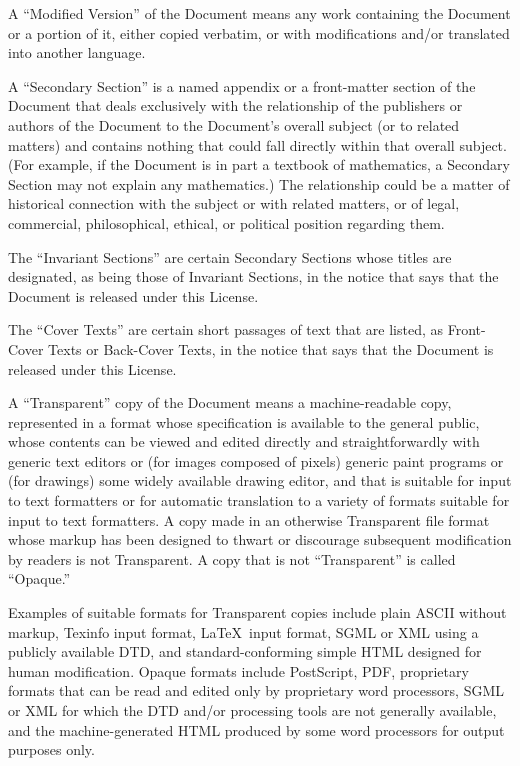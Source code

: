 A ``Modified Version'' of the Document means any work containing
the Document or a portion of it, either copied verbatim, or with modifications
and/or translated into another language.

A ``Secondary Section'' is a named appendix or a front-matter section
of the Document that deals exclusively with the relationship of the
publishers or authors of the Document to the Document's overall subject
(or to related matters) and contains nothing that could fall directly
within that overall subject. (For example, if the Document is in part
a textbook of mathematics, a Secondary Section may not explain any
mathematics.) The relationship could be a matter of historical connection
with the subject or with related matters, or of legal, commercial,
philosophical, ethical, or political position regarding them.

The ``Invariant Sections'' are certain Secondary Sections whose
titles are designated, as being those of Invariant Sections, in the
notice that says that the Document is released under this License.

The ``Cover Texts'' are certain short passages of text that are
listed, as Front-Cover Texts or Back-Cover Texts, in the notice that
says that the Document is released under this License.

A ``Transparent'' copy of the Document means a machine-readable
copy, represented in a format whose specification is available to
the general public, whose contents can be viewed and edited directly
and straightforwardly with generic text editors or (for images composed
of pixels) generic paint programs or (for drawings) some widely available
drawing editor, and that is suitable for input to text formatters
or for automatic translation to a variety of formats suitable for
input to text formatters. A copy made in an otherwise Transparent
file format whose markup has been designed to thwart or discourage
subsequent modification by readers is not Transparent. A copy that
is not ``Transparent'' is called ``Opaque.''

Examples of suitable formats for Transparent copies include plain
ASCII without markup, Texinfo input format, \LaTeX{}~input format,
SGML or XML using a publicly available DTD, and standard-conforming
simple HTML designed for human modification. Opaque formats include
PostScript, PDF, proprietary formats that can be read and edited only
by proprietary word processors, SGML or XML for which the DTD and/or
processing tools are not generally available, and the machine-generated
HTML produced by some word processors for output purposes only.

